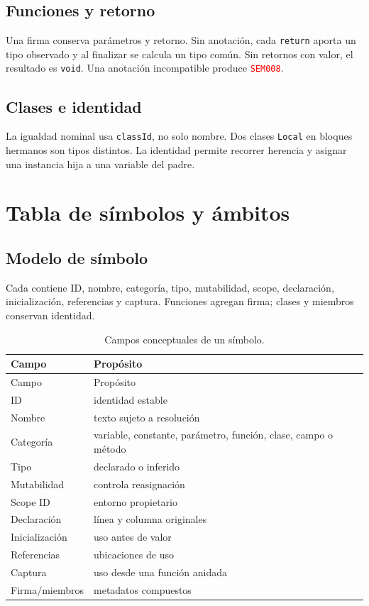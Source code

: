 \documentclass[11pt,letterpaper,oneside]{report}
\newcommand{\archivo}[1]{\path{#1}}
\newcommand{\codigo}[1]{\texttt{#1}}
\newcommand{\diag}[1]{\textcolor{red}{\texttt{#1}}}
\begin{document}
\section{Funciones y retorno}

Una firma conserva parámetros y retorno. Sin anotación, cada \codigo{return} aporta
un tipo observado y al finalizar se calcula un tipo común. Sin retornos con valor, el
resultado es \codigo{void}. Una anotación incompatible produce \diag{SEM008}.

\section{Clases e identidad}

La igualdad nominal usa \codigo{classId}, no solo nombre. Dos clases
\codigo{Local} en bloques hermanos son tipos distintos. La identidad permite recorrer
herencia y asignar una instancia hija a una variable del padre.

\chapter{Tabla de símbolos y ámbitos}

\section{Modelo de símbolo}

Cada \archivo{SymbolEntry} contiene ID, nombre, categoría, tipo, mutabilidad, scope,
declaración, inicialización, referencias y captura. Funciones agregan firma; clases y
miembros conservan identidad.

\begin{longtable}{p{}p{}}
\caption{Campos conceptuales de un símbolo.}\label{tab:symbol-entry}\\
\toprule
Campo & Propósito \\
\midrule
\endfirsthead
\toprule
Campo & Propósito \\
\midrule
\endhead
ID & identidad estable \\
Nombre & texto sujeto a resolución \\
Categoría & variable, constante, parámetro, función, clase, campo o método \\
Tipo & declarado o inferido \\
Mutabilidad & controla reasignación \\
Scope ID & entorno propietario \\
Declaración & línea y columna originales \\
Inicialización & uso antes de valor \\
Referencias & ubicaciones de uso \\
Captura & uso desde una función anidada \\
Firma/miembros & metadatos compuestos \\
\bottomrule
\end{longtable}
\end{document}
